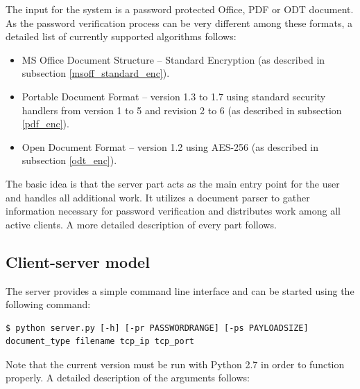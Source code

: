 \documentclass[11pt,oneside]{fithesis2}
\begin{document}
The input for the system is a password protected Office, PDF or ODT document. As the password verification process can be very different among these formats, a detailed list of currently supported algorithms follows:

\begin{itemize}
\setlength\itemsep{0.1em}
	\item{MS Office Document Structure -- Standard Encryption (as described in subsection \ref{msoff_standard_enc}).}
	\item{Portable Document Format --  version 1.3 to 1.7 using standard security handlers from version 1 to 5 and revision 2 to 6 (as described in subsection \ref{pdf_enc}).}
	\item{Open Document Format – version 1.2 using AES-256 (as described in subsection \ref{odt_enc}).}
\end{itemize}

The basic idea is that the server part acts as the main entry point for the user and handles all additional work. It utilizes a document parser to gather information necessary for password verification and distributes work among all active clients. A more detailed description of every part follows. 

\subsection{Client-server model}\label{client-server}

The server provides a simple command line interface and can be started using the following command: 

\begin{lstlisting}
$ python server.py [-h] [-pr PASSWORDRANGE] [-ps PAYLOADSIZE] document_type filename tcp_ip tcp_port
\end{lstlisting}

Note that the current version must be run with Python 2.7 in order to function properly. A detailed description of the arguments follows:
\end{document}
